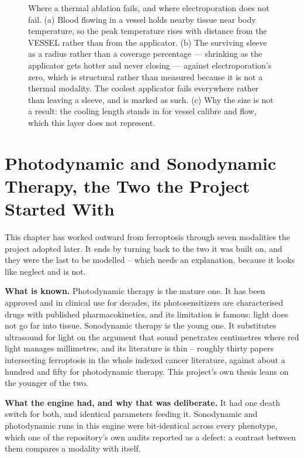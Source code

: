 \documentclass[11pt,twoside,openright]{report}
\begin{document}
\begin{figure}[tbp]
\setcounter{figure}{37}
\caption{Where a thermal ablation fails, and where electroporation does not fail. (a) Blood flowing in a vessel holds nearby tissue near body temperature, so the peak temperature rises with distance from the VESSEL rather than from the applicator. (b) The surviving sleeve as a radius rather than a coverage percentage --- shrinking as the applicator gets hotter and never closing --- against electroporation's zero, which is structural rather than measured because it is not a thermal modality. The coolest applicator fails everywhere rather than leaving a sleeve, and is marked as such. (c) Why the size is not a result: the cooling length stands in for vessel calibre and flow, which this layer does not represent.}
\label{fig:fig42_ablation_sleeve}
\end{figure}

\section{Photodynamic and Sonodynamic Therapy, the Two the Project Started With}

This chapter has worked outward from ferroptosis through seven modalities the project adopted later. It ends by turning back to the two it was built on, and they were the last to be modelled -- which needs an explanation, because it looks like neglect and is not.

\textbf{What is known.} Photodynamic therapy is the mature one. It has been approved and in clinical use for decades, its photosensitizers are characterised drugs with published pharmacokinetics, and its limitation is famous: light does not go far into tissue. Sonodynamic therapy is the young one. It substitutes ultrasound for light on the argument that sound penetrates centimetres where red light manages millimetres, and its literature is thin -- roughly thirty papers intersecting ferroptosis in the whole indexed cancer literature, against about a hundred and fifty for photodynamic therapy. This project's own thesis leans on the younger of the two.

\textbf{What the engine had, and why that was deliberate.} It had one death switch for both, and identical parameters feeding it. Sonodynamic and photodynamic runs in this engine were bit-identical across every phenotype, which one of the repository's own audits reported as a defect: a contrast between them compares a modality with itself.
\end{document}
